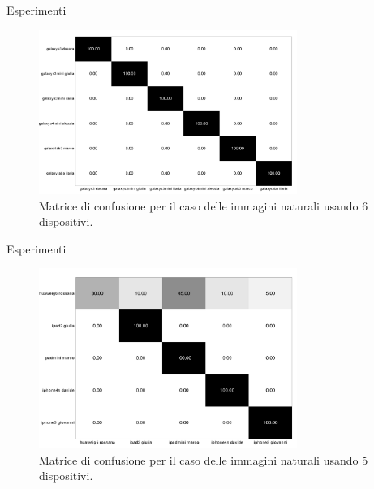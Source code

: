 \begin{tframe}{Esperimenti}

\begin{figure}[h]
\begin{center}
\includegraphics[width=0.75\textwidth]{../images/confusionmatrix_nat_6.png}
\end{center}
  \caption{Matrice di confusione per il caso delle immagini naturali usando 6 dispositivi.}
\label{fig:validation}
\end{figure}

\end{tframe}

\begin{tframe}{Esperimenti}

\begin{figure}[h]
\begin{center}
\includegraphics[width=0.75\textwidth]{../images/confusionmatrix_nat_5.png}
\end{center}
  \caption{Matrice di confusione per il caso delle immagini naturali usando 5 dispositivi.}
\label{fig:validation}
\end{figure}

\end{tframe}

